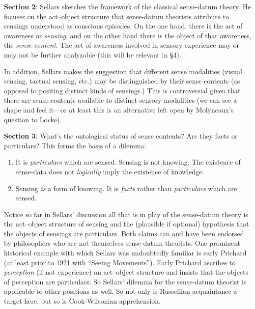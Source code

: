 \documentclass[11pt]{article}
\begin{document}
\textbf{Section 2}: Sellars sketches the framework of the classical sense-datum theory. He focuses on the act--object structure that sense-datum theorists attribute to sensings understood as conscious episodes. On the one hand, there is the act of awareness or \emph{sensing}, and on the other hand there is the object of that awareness, the \emph{sense content}. %
The act of awareness involved in sensory experience may or may not be further analyzable (this will be relevant in §4).

In addition, Sellars makes the suggestion that different sense modalities (visual sensing, tactual sensing, etc.) may be distinguished by their sense contents (as opposed to positing distinct kinds of sensings.) This is controversial given that there are sense contents available to distinct sensory modalities (we can see a shape and feel it---or at least this is an alternative left open by Molyneaux's question to Locke).

\textbf{Section 3}: What's the ontological status of sense contents? Are they facts or particulars? This forms the basis of a dilemma:
\begin{enumerate}
	\item It is \emph{particulars} which are sensed. Sensing is not knowing. The existence of sense-data does not \emph{logically} imply the existence of knowledge.
	\item Sensing \emph{is} a form of knowing. It is \emph{facts} rather than \emph{particulars} which are sensed.
\end{enumerate}

Notice so far in Sellars' discussion all that is in play of the sense-datum theory is the act--object structure of sensing and the (plausible if optional) hypothesis that the objects of sensings are particulars. Both claims can and have been endorsed by philosophers who are not themselves sense-datum theorists. One prominent historical example with which Sellars was undoubtedly familiar is early Prichard (at least prior to 1921 with ``Seeing Movements''). Early Prichard ascribes to \emph{perception} (if not experience) an act--object structure and insists that the objects of perception are particulars. So Sellars' dilemma for the sense-datum theorist is applicable to other positions as well. So not only is Russellian acquaintance a target here, but so is Cook-Wilsonian apprehension.
\end{document}
